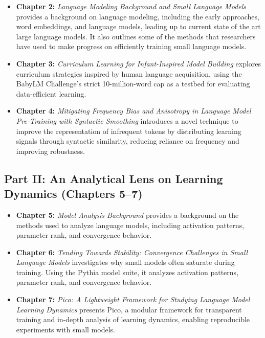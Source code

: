 \begin{itemize}

    \item \textbf{Chapter 2:} \emph{Language Modeling Background and Small Language Models} provides a background on language modeling, including the early approaches, word embeddings, and language models, leading up to current state of the art large language models. It also outlines some of the methods that researchers have used to make progress on efficiently training small language models.

    \item \textbf{Chapter 3:} \emph{Curriculum Learning for Infant-Inspired Model Building}  
    explores curriculum strategies inspired by human language acquisition, using the BabyLM Challenge's strict 10-million-word cap as a testbed for evaluating data-efficient learning.

    \item \textbf{Chapter 4:} \emph{Mitigating Frequency Bias and Anisotropy in Language Model Pre-Training with Syntactic Smoothing}  
    introduces a novel technique to improve the representation of infrequent tokens by distributing learning signals through syntactic similarity, reducing reliance on frequency and improving robustness.
\end{itemize}

\subsection*{Part II: An Analytical Lens on Learning Dynamics (Chapters 5–7)}

\begin{itemize}
    \item \textbf{Chapter 5:} \emph{Model Analysis Background} provides a background on the methods used to analyze language models, including activation patterns, parameter rank, and convergence behavior.

    \item \textbf{Chapter 6:} \emph{Tending Towards Stability: Convergence Challenges in Small Language Models}  
    investigates why small models often saturate during training. Using the Pythia model suite, it analyzes activation patterns, parameter rank, and convergence behavior.

    \item \textbf{Chapter 7:} \emph{Pico: A Lightweight Framework for Studying Language Model Learning Dynamics}  
    presents Pico, a modular framework for transparent training and in-depth analysis of learning dynamics, enabling reproducible experiments with small models.
\end{itemize}

